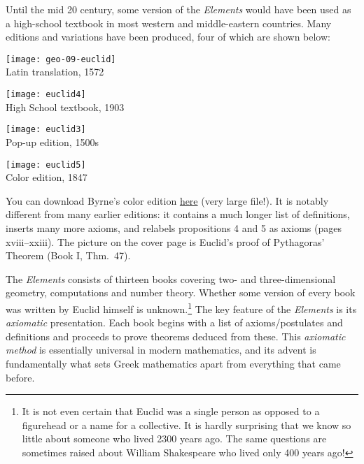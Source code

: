 Until the mid 20\th{} century, some version of the \emph{Elements} would have been used as a high-school textbook in most western and middle-eastern countries. Many editions and variations have been produced, four of which are shown below:
\begin{center}
	\begin{minipage}[b]{0.683\linewidth}\vspace{0pt}
		\centering
		\texttt{[image: geo-09-euclid]}\\
		Latin translation, 1572
	\end{minipage}%
	\begin{minipage}[b]{0.317\linewidth}\vspace{0pt}
		\centering\texttt{[image: euclid4]}\\
		High School textbook, 1903
	\end{minipage}%
	\smallbreak
	\begin{minipage}[b]{0.67\linewidth}\vspace{0pt}
		\centering\texttt{[image: euclid3]}\\
		Pop-up edition, 1500s
	\end{minipage}%
	\begin{minipage}[b]{0.33\linewidth}\vspace{0pt}
		\centering\texttt{[image: euclid5]}\\
		Color edition, 1847
	\end{minipage}
\end{center}

You can download Byrne's color edition \href{http://math.uci.edu/~ndonalds/Elements-I-VI.pdf}{here} (very large file!). It is notably different from many earlier editions: it contains a much longer list of definitions, inserts many more axioms, and relabels propositions 4 and 5 as axioms (pages xviii--xxiii). The picture on the cover page is Euclid's proof of Pythagoras' Theorem (Book I, Thm.\ 47).
\goodbreak



The \emph{Elements} consists of thirteen books covering two- and three-dimensional geometry, computations and number theory. Whether some version of every book was written by Euclid himself is unknown.\footnote{It is not even certain that Euclid was a single person as opposed to a figurehead or a name for a collective. It is hardly surprising that we know so little about someone who lived 2300 years ago. The same questions are sometimes raised about William Shakespeare who lived only 400 years ago!} The key feature of the \emph{Elements} is its \emph{axiomatic} presentation. Each book begins with a list of axioms/postulates and definitions and proceeds to prove theorems deduced from these. This \emph{axiomatic method} is essentially universal in modern mathematics, and its advent is fundamentally what sets Greek mathematics apart from everything that came before.\smallbreak

